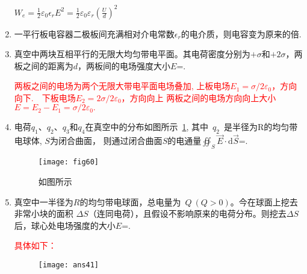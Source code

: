 \begin{enumerate}
    \begin{note}
        $W_e=\frac{1}{2}\varepsilon_0\epsilon_r E^2=\frac{1}{2}\varepsilon_0\varepsilon_r(\frac{U}{d})^2$
    \end{note}
    \item 一平行板电容器二极板间充满相对介电常数$\epsilon_r$的电介质，则电容变为原来的\underline{}倍.
    \item 真空中两块互相平行的无限大均匀带电平面。其电荷密度分别为$+\sigma$和$+2\sigma$，两板之间的距离为$d$，两板间的电场强度大小$E$=.
    \begin{note}
        \textcolor{red}{两板之间的电场为两个无限大带电平面电场叠加, 上板电场$E_1= \sigma/2\varepsilon_0$，方向向下.\ \ 下板电场$E_2= 2\sigma/2\varepsilon_0$，方向向上
        两板之间的电场方向向上大小$E=E_2-E_1 = \sigma/2\varepsilon_0.$
        }
    \end{note}
    \item 电荷$q_1$、$q_2$、$q_3$和$q_4$在真空中的分布如图所示~\ref{Fig:60}, 
    其中~$q_2$~是半径为R的均匀带电球体, $S$为闭合曲面，
    则通过闭合曲面$S$的电通量$\displaystyle{\oiint_S {\vec{E}\cdot \mathrm{d}\vec{S}}}$=.
    \begin{figure}[H]
        \centering
        \texttt{[image: fig60]}
        \caption{如图所示}\label{Fig:60}
    \end{figure}
    \item 真空中一半径为$R$的均匀带电球面，总电量为~$Q~(Q>0)$。今在球面上挖去非常小块的面积 $\Delta S$（连同电荷），且假设不影响原来的电荷分布。则挖去$\Delta S$后，球心处电场强度的大小$E$=.
    \begin{note}
        \textcolor{red}{具体如下：}
        \begin{figure}[H]
            \centering
            \texttt{[image: ans41]}
        \end{figure}
    \end{note}
\end{enumerate}
